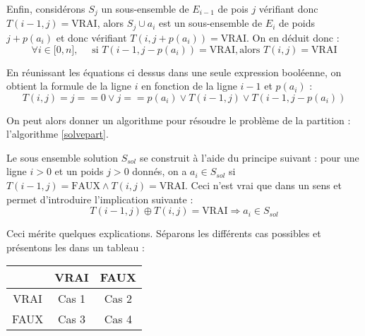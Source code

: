 Enfin, considérons $S_j$ un sous-ensemble de $E_{i-1}$ de pois $j$ vérifiant donc $T(i-1, j) =
\mbox{VRAI}$, alors $S_j \cup a_i$ est un sous-ensemble de $E_i$ de poids $j+p(a_i)$ et donc
vérifiant $T(i,j+p(a_i)) = \mbox{VRAI}$. On en déduit donc :
\begin{equation}
	\forall i \in \mathbb{[}0, n \mathbb{]}, \quad \mbox{ si } T(i-1, j-p(a_i)) = \mbox{VRAI}, \mbox{
	alors } T(i,j) = \mbox{VRAI}
\end{equation}

En réunissant les équations ci dessus dans une seule expression booléenne, on obtient la formule de
la ligne $i$ en fonction de la ligne $i-1$ et $p(a_i)$ :
\begin{equation}
	T(i,j) = j == 0 \vee j == p(a_i) \vee T(i-1, j) \vee T(i-1, j-p(a_i))
\end{equation}

On peut alors donner un algorithme pour résoudre le problème de la partition : l'algorithme
\ref{solvepart}.



Le sous ensemble solution $S_{sol}$ se construit à l'aide du principe suivant : pour une ligne $i>0$ et
un poids $j>0$ donnés, on a $a_i \in S_{sol}$ si $T(i-1, j) = \mbox{FAUX} \wedge T(i,j) =
\mbox{VRAI}$. Ceci n'est vrai que dans un sens et permet d'introduire l'implication suivante :
\begin{equation}
	\label{ineq}
	T(i-1, j) \oplus T(i, j) = \mbox{VRAI} \Rightarrow a_i \in S_{sol} 
\end{equation}

Ceci mérite quelques explications. Séparons les différents cas possibles et présentons les dans un
tableau : \\
\begin{center}
\begin{tabular}{|c|c|c|} \hline
	\backslashbox{$T(i-1, j)$}{$T(i,j)$} & VRAI & FAUX \\	\hline
	VRAI & Cas 1 & Cas 2 \\ \hline
	FAUX & Cas 3 & Cas 4 \\ \hline
\end{tabular}
\end{center}

